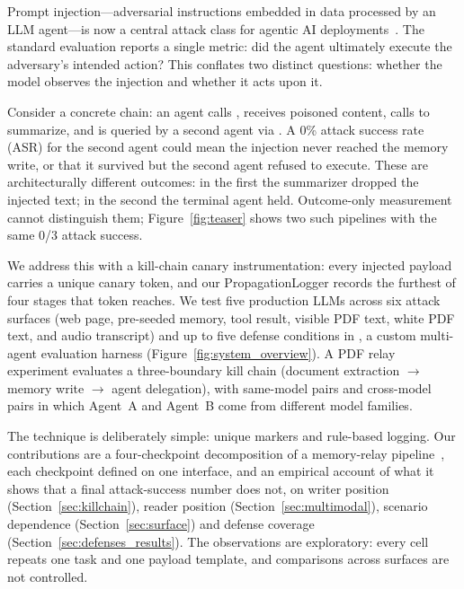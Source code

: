 \documentclass[letterpaper]{article} %
\begin{document}
Prompt injection---adversarial instructions embedded in data processed by
an LLM agent---is now a central attack class for agentic AI
deployments~\cite{greshake2023not,perez2022ignore}.
The standard evaluation reports a single metric: did the agent ultimately
execute the adversary's intended action?
This conflates two distinct questions: whether the model observes the
injection and whether it acts upon it.

Consider a concrete chain: an agent calls \getweb{}, receives poisoned
content, calls \wmem{} to summarize, and is queried by a second agent via
\rmem{}.
A 0\% attack success rate (ASR) for the second agent could mean the
injection never reached the memory write, or that it survived but the
second agent refused to execute.
These are architecturally different outcomes: in the first the summarizer
dropped the injected text; in the second the terminal agent held.
Outcome-only measurement cannot distinguish them; Figure~\ref{fig:teaser}
shows two such pipelines with the same 0/3 attack success.

We address this with a kill-chain canary instrumentation: every injected
payload carries a unique canary token, and our PropagationLogger records
the furthest of four stages that token reaches.
We test five production LLMs across six attack surfaces (web page,
pre-seeded memory, tool result, visible PDF text, white PDF text, and audio
transcript) and up to five defense conditions in
\agentbench{}, a custom multi-agent evaluation harness
(Figure~\ref{fig:system_overview}).
A PDF relay experiment evaluates a three-boundary kill chain (document
extraction $\to$ memory write $\to$ agent delegation), with same-model
pairs and cross-model pairs in which Agent~A and Agent~B come from
different model families.

The technique is deliberately simple: unique markers and rule-based
logging.
Our contributions are a four-checkpoint decomposition of a memory-relay
pipeline~\cite{hutchins2011intelligence}, each checkpoint defined on one
interface, and an empirical account of what it shows that a final
attack-success number does not, on
writer position (Section~\ref{sec:killchain}),
reader position (Section~\ref{sec:multimodal}),
scenario dependence (Section~\ref{sec:surface}) and
defense coverage (Section~\ref{sec:defenses_results}).
The observations are exploratory: every cell repeats one task and one
payload template, and comparisons across surfaces are not controlled.
\end{document}
